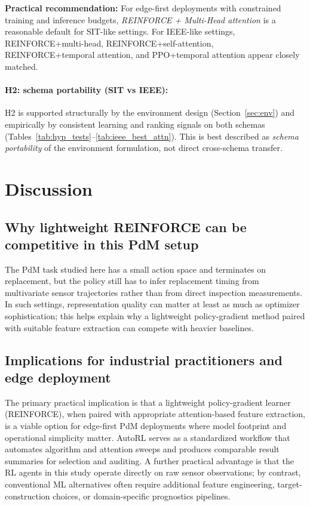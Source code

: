 \documentclass[sn-basic]{sn-jnl} %
\begin{document}
\textbf{Practical recommendation:}
For edge-first deployments with constrained training and inference budgets, \emph{REINFORCE + Multi-Head attention} is a reasonable default for SIT-like settings. For IEEE-like settings, \textsc{REINFORCE}+multi-head, \textsc{REINFORCE}+self-attention, \textsc{REINFORCE}+temporal attention, and PPO+temporal attention appear closely matched.

\paragraph{H2: schema portability (SIT vs IEEE):}
H2 is supported structurally by the environment design (Section~\ref{sec:env}) and empirically by consistent learning and ranking signals on both schemas (Tables~\ref{tab:hyp_tests}--\ref{tab:ieee_best_attn}). This is best described as \emph{schema portability} of the environment formulation, not direct cross-schema transfer.

\section{Discussion}
\label{sec:discussion}
\subsection{Why lightweight REINFORCE can be competitive in this PdM setup}
The PdM task studied here has a small action space and terminates on replacement, but the policy still has to infer replacement timing from multivariate sensor trajectories rather than from direct inspection measurements. In such settings, representation quality can matter at least as much as optimizer sophistication; this helps explain why a lightweight policy-gradient method paired with suitable feature extraction can compete with heavier baselines.

\subsection{Implications for industrial practitioners and edge deployment}
The primary practical implication is that a lightweight policy-gradient learner (\textsc{REINFORCE}), when paired with appropriate attention-based feature extraction, is a viable option for edge-first PdM deployments where model footprint and operational simplicity matter. AutoRL serves as a standardized workflow that automates algorithm and attention sweeps and produces comparable result summaries for selection and auditing. A further practical advantage is that the RL agents in this study operate directly on raw sensor observations; by contrast, conventional ML alternatives often require additional feature engineering, target-construction choices, or domain-specific prognostics pipelines.
\end{document}
